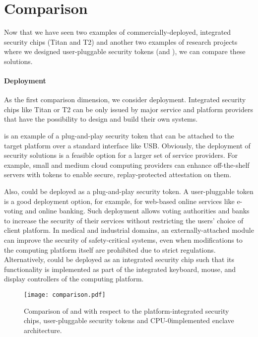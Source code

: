 
\section*{Comparison}

Now that we have seen two examples of commercially-deployed, integrated security chips (Titan and T2) and another two examples of research projects where we designed user-pluggable security tokens (\protection and \proximitee), we can compare these solutions. 

\paragraph{Deployment}
As the first comparison dimension, we consider deployment. Integrated security chips like Titan or T2 can be only issued by major service and platform providers that have the possibility to design and build their own systems. 

\proximitee is an example of a plug-and-play security token that can be attached to the target platform over a standard interface like USB. Obviously, the deployment of security solutions is a feasible option for a larger set of service providers. For example, small and medium cloud computing providers can enhance off-the-shelf servers with \proximitee tokens to enable secure, replay-protected attestation on them. 

Also, \protection could be deployed as a plug-and-play security token. A user-pluggable token is a good deployment option, for example, for web-based online services like e-voting and online banking. Such deployment allows voting authorities and banks to increase the security of their services without restricting the users’ choice of client platform. In medical and industrial domains, an externally-attached \protection module can improve the security of safety-critical systems, even when modifications to the computing platform itself are prohibited due to strict regulations. Alternatively, \protection could be deployed as an integrated security chip such that its functionality is implemented as part of the integrated keyboard, mouse, and display controllers of the computing platform. 

\begin{figure}[t]
    \centering
    \texttt{[image: comparison.pdf]}
    \caption{Comparison of \protection and \proximitee with respect to the platform-integrated security chips, user-pluggable security tokens and CPU-0implemented enclave architecture.}
\label{fig:prototype}   
\end{figure}


